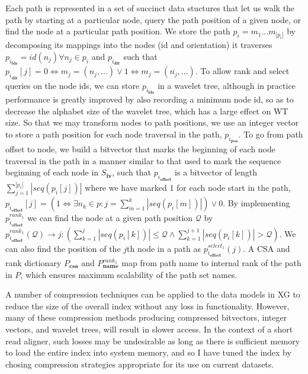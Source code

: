 Each path is represented in a set of succinct data stuctures that let us walk the path by starting at a particular node, query the path position of a given node, or find the node at a particular path position.
We store the path $p_i = m_1 \ldots m_{|p_i|}$ by decomposing its mappings into the nodes (id and orientation) it traverses $p_{i_\textbf{ids}} = id(n_j) \forall n_j \in p_i$ and $p_{i_\textbf{dir}}$ such that $p_{i_\textbf{dir}}[j] = 0 \iff m_j = (n_j, \ldots) \lor 1 \iff m_j = (\overline{n_j}, \ldots)$.
To allow rank and select queries on the node ids, we can store $p_{i_\textbf{ids}}$ in a wavelet tree, although in practice performance is greatly improved by also recording a minimum node id, so as to decrease the alphabet size of the wavelet tree, which has a large effect on WT size.
So that we may transform nodes to path positions, we use an integer vector to store a path position for each node traversal in the path, $p_{i_\textbf{pos}}$.
To go from path offset to node, we build a bitvector that marks the beginning of each node traversal in the path in a manner similar to that used to mark the sequence beginning of each node in $S_\textbf{iv}$, such that $p_{i_\textbf{offset}}$ is a bitvector of length $\sum_{j=1}^{|p_i|} |seq(p_i[j])|$ where we have marked 1 for each node start in the path, $p_{i_\textbf{offset}}[j] = \left( 1 \iff \exists n_k \in p : j = \sum_{m=1}^{k} |seq(p_i[m])| \right) \lor 0$.
By implementing $p_{i_\textbf{offset}}^{rank_1}$ we can find the node at a given path position $\mathcal{Q}$ by $p_{i_\textbf{offset}}^{rank_1}(\mathcal{Q}) \to j : \left( \sum_{k=1}^{j} |seq(p_i[k])| \leq \mathcal{Q} \land \sum_{k=1}^{j+1} |seq(p_i[k])| > \mathcal{Q} \right)$.
We can also find the position of the $j$th node in a path as $p_{i_\textbf{offset}}^{select_1}(j)$.
A CSA and rank dictionary $P_\textbf{csa}$ and $P_\textbf{name}^{rank_1}$ map from path name to internal rank of the path in $P$, which ensures maximum scalability of the path set names.

A number of compression techniques can be applied to the data models in XG to reduce the size of the overall index without any loss in functionality.
However, many of these compression methods producing compressed bitvectors, integer vectors, and wavelet trees, will result in slower access.
In the context of a short read aligner, such losses may be undesirable as long as there is sufficient memory to load the entire index into system memory, and so I have tuned the index by chosing compression strategies appropriate for its use on current datasets.

